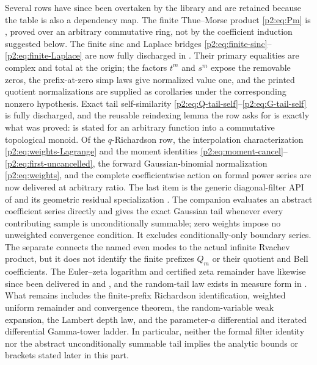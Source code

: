 \documentclass[11pt,oneside]{article}
\numberwithin{equation}{section}
\theoremstyle{definition}
\theoremstyle{remark}
\begin{document}
Several rows have since been overtaken by the library and are retained because
the table is also a dependency map.  The finite Thue--Morse product
\eqref{p2:eq:Pm} is
, proved over an arbitrary commutative
ring, not by the coefficient induction suggested below.  The finite sinc and
Laplace bridges \eqref{p2:eq:finite-sinc}--\eqref{p2:eq:finite-Laplace} are now
fully discharged in .  Their primary
equalities are complex and total at the origin; the factors $t^m$ and $s^m$
expose the removable zeros, the prefix-at-zero simp laws give normalized value
one, and the printed quotient normalizations are supplied as corollaries under
the corresponding nonzero hypothesis.  Exact tail self-similarity
\eqref{p2:eq:Q-tail-self}--\eqref{p2:eq:G-tail-self} is fully discharged, and the reusable
reindexing lemma the row asks for is exactly what was proved:
 is stated for an arbitrary function into a commutative
topological monoid.  Of the $q$-Richardson row, the interpolation characterization
\eqref{p2:eq:weights-Lagrange} and the moment identities
\eqref{p2:eq:moment-cancel}--\eqref{p2:eq:first-uncancelled}, the forward
Gaussian-binomial normalization \eqref{p2:eq:weights}, and the complete
coefficientwise action on formal power series are now delivered at arbitrary
ratio.  The last item is the generic diagonal-filter API of
 and its geometric residual specialization
.  The companion
 evaluates an abstract coefficient series
directly and gives the exact Gaussian tail whenever every contributing sample
is unconditionally summable; zero weights impose no unweighted convergence
condition.  It excludes conditionally-only boundary series.  The separate
 connects the named even modes to the actual
infinite Rvachev product, but it does not identify the finite prefixes \(Q_m\)
or their quotient and Bell coefficients.  The Euler--zeta logarithm and
certified zeta remainder have likewise since been delivered in
 and , and the
random-tail law exists in measure form in .  What
remains includes the finite-prefix Richardson identification, weighted uniform
remainder and convergence theorem, the random-variable weak expansion, the
Lambert depth law, and the parameter-\(a\) differential and iterated
differential Gamma-tower ladder.
In particular, neither the formal filter identity
nor the abstract unconditionally summable tail implies the analytic bounds or
brackets stated later in this part.
\end{document}
